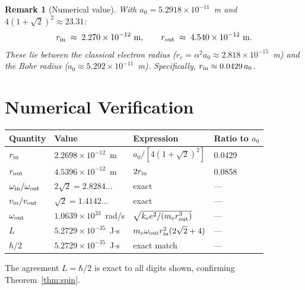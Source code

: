 \documentclass[12pt]{article}
\newtheorem{remark}[theorem]{Remark}
\newcommand{\rin}{r_{\rm in}}
\newcommand{\rout}{r_{\rm out}}
\newcommand{\oin}{\omega_{\rm in}}
\newcommand{\oout}{\omega_{\rm out}}
\newcommand{\aBohr}{a_0}
\begin{document}
\begin{remark}[Numerical value]
With $\aBohr = 5.2918\times 10^{-11}$~m and
$4(1+\sqrt{2})^2 \approx 23.31$:
\begin{equation}
  \rin \;\approx\; 2.270\times 10^{-12}\ \text{m},
  \qquad
  \rout \;\approx\; 4.540\times 10^{-12}\ \text{m}.
  \label{eq:rin_numeric}
\end{equation}
These lie between the classical electron radius
($r_e = \alpha^2\aBohr \approx 2.818\times 10^{-15}$~m) and the
Bohr radius ($\aBohr \approx 5.292\times 10^{-11}$~m).
Specifically, $\rin \approx 0.0429\,\aBohr$.
\end{remark}

\section{Numerical Verification}
\label{sec:verification}

\begin{center}
\renewcommand{\arraystretch}{1.4}
\begin{tabular}{@{}llll@{}}
\toprule
Quantity & Value & Expression & Ratio to $a_0$ \\
\midrule
$\rin$          & $2.2698\times 10^{-12}$~m
                & $\aBohr/[4(1+\sqrt{2})^2]$ & 0.0429 \\
$\rout$         & $4.5396\times 10^{-12}$~m
                & $2\rin$ & 0.0858 \\
$\oin/\oout$    & $2\sqrt{2} = 2.8284\ldots$
                & exact & --- \\
$v_{\rm in}/v_{\rm out}$ & $\sqrt{2} = 1.4142\ldots$
                & exact & --- \\
$\oout$         & $1.0639\times 10^{23}$~rad/s
                & $\sqrt{k_e e^2/(m_e\rout^3)}$ & --- \\
$L$             & $5.2729\times 10^{-35}$~J$\cdot$s
                & $m_e\oout\rin^2(2\sqrt{2}+4)$ & --- \\
$\hbar/2$       & $5.2729\times 10^{-35}$~J$\cdot$s
                & exact match & --- \\
\bottomrule
\end{tabular}
\end{center}

The agreement $L = \hbar/2$ is exact to all digits shown, confirming
Theorem~\ref{thm:spin}.

\end{document}
